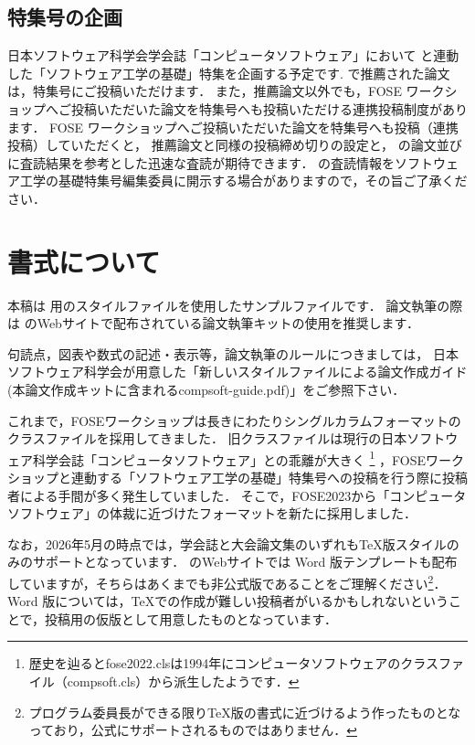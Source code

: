 \documentclass[T,J]{fose} %
\begin{document}
\subsection{特集号の企画}

日本ソフトウェア科学会学会誌「コンピュータソフトウェア」において {\foseabbrev} と連動した「ソフトウェア工学の基礎」特集を企画する予定です. 
{\foseabbrev} で推薦された論文は，特集号にご投稿いただけます．
また，推薦論文以外でも，FOSE ワークショップへご投稿いただいた論文を特集号へも投稿いただける連携投稿制度があります．
FOSE ワークショップへご投稿いただいた論文を特集号へも投稿（連携投稿）していただくと，
推薦論文と同様の投稿締め切りの設定と，{\foseabbrev} の論文並びに査読結果を参考とした迅速な査読が期待できます．
{\foseabbrev} の査読情報をソフトウェア工学の基礎特集号編集委員に開示する場合がありますので，その旨ご了承ください．


\section{書式について} \label{sec:PaperStyle}
本稿は \foseabbrev 用のスタイルファイルを使用したサンプルファイルです．
論文執筆の際は \foseabbrev のWebサイトで配布されている論文執筆キットの使用を推奨します．

句読点，図表や数式の記述・表示等，論文執筆のルールにつきましては，
日本ソフトウェア科学会が用意した「新しいスタイルファイルによる論文作成ガイド(本論文作成キットに含まれるcompsoft-guide.pdf)」をご参照下さい．

これまで，FOSEワークショップは長きにわたりシングルカラムフォーマットのクラスファイルを採用してきました．
旧クラスファイルは現行の日本ソフトウェア科学会誌「コンピュータソフトウェア」との乖離が大きく
\footnote{歴史を辿るとfose2022.clsは1994年にコンピュータソフトウェアのクラスファイル（compsoft.cls）から派生したようです．}
，FOSEワークショップと連動する「ソフトウェア工学の基礎」特集号への投稿を行う際に投稿者による手間が多く発生していました．
そこで，FOSE2023から「コンピュータソフトウェア」の体裁に近づけたフォーマットを新たに採用しました．

なお，2026年5月の時点では，学会誌と大会論文集のいずれもTeX版スタイルのみのサポートとなっています．
\foseabbrev のWebサイトでは Word 版テンプレートも配布していますが，そちらはあくまでも非公式版であることをご理解ください\footnote{プログラム委員長ができる限りTeX版の書式に近づけるよう作ったものとなっており，公式にサポートされるものではありません．}．
Word 版については，\TeX での作成が難しい投稿者がいるかもしれないということで，投稿用の仮版として用意したものとなっています．
\end{document}
